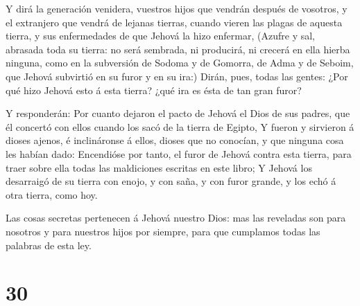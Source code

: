  Y dirá la generación venidera, vuestros hijos que vendrán
después de vosotros, y el extranjero que vendrá de lejanas tierras,
cuando vieren las plagas de aquesta tierra, y sus enfermedades de que
Jehová la hizo enfermar,  (Azufre y sal, abrasada toda su
tierra: no será sembrada, ni producirá, ni crecerá en ella hierba
ninguna, como en la subversión de Sodoma y de Gomorra, de Adma y de
Seboim, que Jehová subvirtió en su furor y en su ira:) 
Dirán, pues, todas las gentes: ¿Por qué hizo Jehová esto á esta tierra?
¿qué ira es ésta de tan gran furor?

 Y responderán: Por cuanto dejaron el pacto de Jehová el
Dios de sus padres, que él concertó con ellos cuando los sacó de la
tierra de Egipto,  Y fueron y sirvieron á dioses ajenos, é
inclináronse á ellos, dioses que no conocían, y que ninguna cosa les
habían dado:  Encendióse por tanto, el furor de Jehová
contra esta tierra, para traer sobre ella todas las maldiciones escritas
en este libro;  Y Jehová los desarraigó de su tierra con
enojo, y con saña, y con furor grande, y los echó á otra tierra, como
hoy.

 Las cosas secretas pertenecen á Jehová nuestro Dios: mas
las reveladas son para nosotros y para nuestros hijos por siempre, para
que cumplamos todas las palabras de esta ley.

\hypertarget{section-29}{%
\section{30}\label{section-29}}

